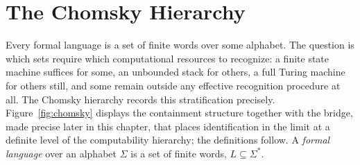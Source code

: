 
\section{The Chomsky Hierarchy}
\label{sec:chomsky}

Every formal language is a set of finite words over some alphabet. The question is which sets require which computational resources to recognize: a finite state machine suffices for some, an unbounded stack for others, a full Turing machine for others still, and some remain outside any effective recognition procedure at all. The Chomsky hierarchy records this stratification precisely. Figure~\ref{fig:chomsky} displays the containment structure together with the bridge, made precise later in this chapter, that places identification in the limit at a definite level of the computability hierarchy; the definitions follow. A \emph{formal language} over an alphabet $\Sigma$ is a set of finite words, $L \subseteq \Sigma^\ast$.

